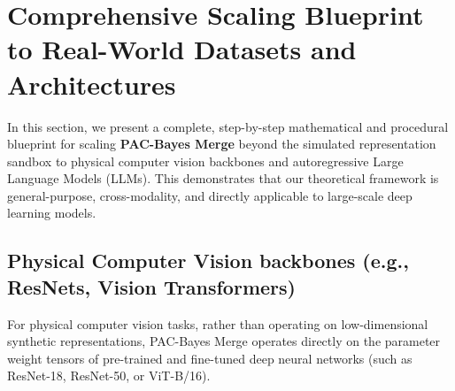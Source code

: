 \section{Comprehensive Scaling Blueprint to Real-World Datasets and Architectures}
\label{app:scaling_blueprint}

In this section, we present a complete, step-by-step mathematical and procedural blueprint for scaling \textbf{PAC-Bayes Merge} beyond the simulated representation sandbox to physical computer vision backbones and autoregressive Large Language Models (LLMs). This demonstrates that our theoretical framework is general-purpose, cross-modality, and directly applicable to large-scale deep learning models.

\subsection{Physical Computer Vision backbones (e.g., ResNets, Vision Transformers)}
For physical computer vision tasks, rather than operating on low-dimensional synthetic representations, PAC-Bayes Merge operates directly on the parameter weight tensors of pre-trained and fine-tuned deep neural networks (such as ResNet-18, ResNet-50, or ViT-B/16). 

